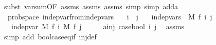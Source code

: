 \begin{isabellebody}
\ {\isacharparenleft}{\kern0pt}subst\ var{\isacharunderscore}{\kern0pt}sum{\isacharunderscore}{\kern0pt}{}{\isacharbrackleft}{\kern0pt}OF\ assms{\isacharparenleft}{\kern0pt}{}{\isacharparenright}{\kern0pt}\ assms{\isacharparenleft}{\kern0pt}{}{\isacharparenright}{\kern0pt}\ assms{\isacharparenleft}{\kern0pt}{}{\isacharparenright}{\kern0pt}{\isacharbrackright}{\kern0pt}{\isacharcomma}{\kern0pt}\ simp{\isacharcomma}{\kern0pt}\ simp\ add{\isacharcolon}{\kern0pt}a{\isacharparenright}{\kern0pt}\isanewline
{}\isamarkupfalse%
%
\endisatagproof
{\isafoldproof}%
%
\isadelimproof
\isanewline
%
\endisadelimproof
\isanewline
{}\isamarkupfalse%
\ {\isacharparenleft}{\kern0pt}\ prob{\isacharunderscore}{\kern0pt}space{\isacharparenright}{\kern0pt}\ indep{\isacharunderscore}{\kern0pt}var{\isacharunderscore}{\kern0pt}from{\isacharunderscore}{\kern0pt}indep{\isacharunderscore}{\kern0pt}vars{\isacharcolon}{\kern0pt}\isanewline
\ \ \ {\isachardoublequoteopen}i\ {\isasymnoteq}\ j{\isachardoublequoteclose}\isanewline
\ \ \ {\isachardoublequoteopen}indep{\isacharunderscore}{\kern0pt}vars\ {\isacharparenleft}{\kern0pt}{\isasymlambda}{\isacharunderscore}{\kern0pt}{\isachardot}{\kern0pt}\ M{\isacharprime}{\kern0pt}{\isacharparenright}{\kern0pt}\ f\ {\isacharbraceleft}{\kern0pt}i{\isacharcomma}{\kern0pt}\ j{\isacharbraceright}{\kern0pt}{\isachardoublequoteclose}\ \isanewline
\ \ \ {\isachardoublequoteopen}indep{\isacharunderscore}{\kern0pt}var\ M{\isacharprime}{\kern0pt}\ {\isacharparenleft}{\kern0pt}f\ i{\isacharparenright}{\kern0pt}\ M{\isacharprime}{\kern0pt}\ {\isacharparenleft}{\kern0pt}f\ j{\isacharparenright}{\kern0pt}{\isachardoublequoteclose}\isanewline
%
\isadelimproof
%
\endisadelimproof
%
\isatagproof
{}\isamarkupfalse%
\ {\isacharminus}{\kern0pt}\isanewline
\ \ \isamarkupfalse%
\ a{\isacharcolon}{\kern0pt}{\isachardoublequoteopen}inj\ {\isacharparenleft}{\kern0pt}case{\isacharunderscore}{\kern0pt}bool\ i\ j{\isacharparenright}{\kern0pt}{\isachardoublequoteclose}\ \isamarkupfalse%
\ assms{\isacharparenleft}{\kern0pt}{}{\isacharparenright}{\kern0pt}\ \isanewline
\ \ \ \ \isamarkupfalse%
\ {\isacharparenleft}{\kern0pt}simp\ add{\isacharcolon}{\kern0pt}\ bool{\isachardot}{\kern0pt}case{\isacharunderscore}{\kern0pt}eq{\isacharunderscore}{\kern0pt}if\ inj{\isacharunderscore}{\kern0pt}def{\isacharparenright}{\kern0pt}\isanewline
\ \ \isamarkupfalse%

\end{isabellebody}
